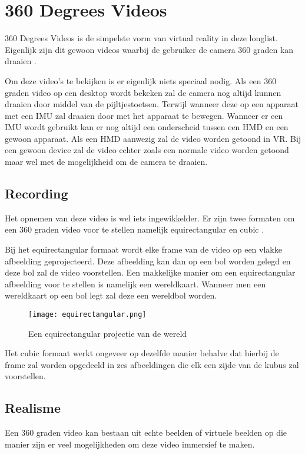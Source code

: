 \section{360 Degrees Videos}
360 Degrees Videos is de simpelste vorm van virtual reality in deze longlist. Eigenlijk zijn dit gewoon videos waarbij de gebruiker de camera 360 graden kan draaien \autocite{Hosseini2016}.

Om deze video's te bekijken is er eigenlijk niets speciaal nodig. Als een 360 graden video op een desktop wordt bekeken zal de camera nog altijd kunnen draaien door middel van de pijltjestoetsen. Terwijl wanneer deze op een apparaat met een IMU zal draaien door met het apparaat te bewegen. Wanneer er een IMU wordt gebruikt kan er nog altijd een onderscheid tussen een HMD en een gewoon apparaat. Als een HMD aanwezig zal de video worden getoond in VR. Bij een gewoon device zal de video echter zoals een normale video worden getoond maar wel met de mogelijkheid om de camera te draaien.

\subsection{Recording}
Het opnemen van deze video is wel iets ingewikkelder. Er zijn twee formaten om een 360 graden video voor te stellen namelijk equirectangular en cubic \autocite{Lee2010}. 

Bij het equirectangular formaat wordt elke frame van de video op een vlakke afbeelding geprojecteerd. Deze afbeelding kan dan op een bol worden gelegd en deze bol zal de video voorstellen. Een makkelijke manier om een equirectangular afbeelding voor te stellen is namelijk een wereldkaart. Wanneer men een wereldkaart op een bol legt zal deze een wereldbol worden.
 
\begin{figure}
    \texttt{[image: equirectangular.png]}
    \caption{Een equirectangular projectie van de wereld}
    \label{fig:equirectangularprojection}
\end{figure}

Het cubic formaat werkt ongeveer op dezelfde manier behalve dat hierbij de frame zal worden opgedeeld in zes afbeeldingen die elk een zijde van de kubus zal voorstellen.

\subsection{Realisme}
Een 360 graden video kan bestaan uit echte beelden of virtuele beelden op die manier zijn er veel mogelijkheden om deze video immersief te maken. 

